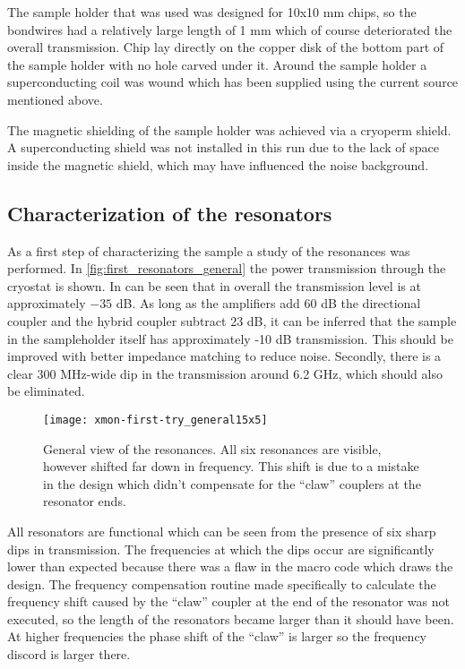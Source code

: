 The sample holder that was used was designed for 10x10 mm chips, so the bondwires had a relatively large length of 1 mm which of course deteriorated the overall transmission. Chip lay directly on the copper disk of the bottom part of the sample holder with no hole carved under it. Around the sample holder a superconducting coil was wound which has been supplied using the current source mentioned above.

The magnetic shielding of the sample holder was achieved via a cryoperm shield. A superconducting shield was not installed in this run due to the lack of space inside the magnetic shield, which may have influenced the noise background.


\subsection{Characterization of the resonators}

As a first step of characterizing the sample a study of the resonances was performed. In \autoref{fig:first_resonators_general} the power transmission through the cryostat is shown. In can be seen that in overall the transmission level is at approximately $-35$ dB. As long as the amplifiers add 60 dB the directional coupler and the hybrid coupler subtract 23 dB, it can be inferred that the sample in the sampleholder itself has approximately -10 dB transmission. This should be improved with better impedance matching to reduce noise. Secondly, there is a clear 300 MHz-wide dip in the transmission around 6.2 GHz, which should also be eliminated.

\begin{figure}[h]
\centering
\texttt{[image: xmon-first-try\_general15x5]}
\caption{General view of the resonances. All six resonances are visible, however shifted far down in frequency. This shift is due to a mistake in the design which didn't compensate for the ``claw'' couplers at the resonator ends.}
\label{fig:first_resonators_general}
\end{figure}

All resonators are functional which can be seen from the presence of six sharp dips in transmission. The frequencies at which the dips occur are significantly lower than expected because there was a flaw in the macro code which draws the design. The frequency compensation routine made specifically to calculate the frequency shift\cite{Sank2014} caused by the ``claw'' coupler at the end of the resonator was not executed, so the length of the resonators became larger than it should have been. At higher frequencies the phase shift of the ``claw'' is larger so the frequency discord is larger there.

